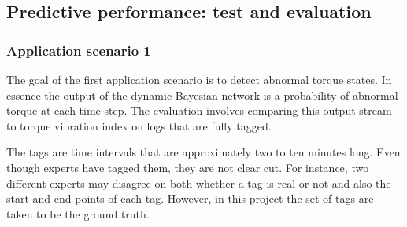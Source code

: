 \documentclass{article}
\theoremstyle{theorem}
\theoremstyle{definition}
\begin{document}
%
%

\subsection{Predictive performance: test and evaluation}

\subsubsection{Application scenario 1}

The goal of the first application scenario is to detect abnormal torque states.  In essence the output of the dynamic Bayesian network is a probability of abnormal torque at each time step. The evaluation involves comparing this output stream to torque vibration index on logs that are fully tagged.  

The tags are time intervals that are approximately two to ten minutes long. Even though experts have tagged them, they are not clear cut.  For instance, two different experts may disagree on both whether a tag is real or not and also the start and end points of each tag.  However, in this project the set of tags are taken to be the ground truth.  
\end{document}

